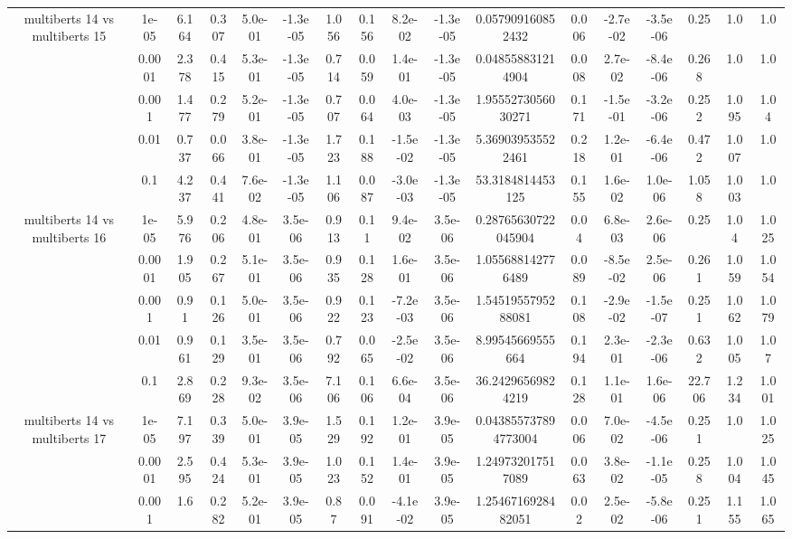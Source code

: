 \begin{tabular}{|c|c|c|c|c|c|c|c|c|c|c|c|c|c|c|c|c|}
\hline
\multirow{5}{*}{multiberts 14 vs multiberts 15} & 1e-05 & 6.164 & 0.307 & 5.0e-01 & -1.3e-05 & 1.056 & 0.156 & 8.2e-02 & -1.3e-05 & 0.057909160852432 & 0.006 & -2.7e-02 & -3.5e-06 & 0.25 & 1.0 & 1.0 \\
 & 0.0001 & 2.378 & 0.415 & 5.3e-01 & -1.3e-05 & 0.714 & 0.059 & 1.4e-01 & -1.3e-05 & 0.048558831214904 & 0.008 & 2.7e-02 & -8.4e-06 & 0.268 & 1.0 & 1.0 \\
 & 0.001 & 1.477 & 0.279 & 5.2e-01 & -1.3e-05 & 0.707 & 0.064 & 4.0e-03 & -1.3e-05 & 1.9555273056030271 & 0.171 & -1.5e-01 & -3.2e-06 & 0.252 & 1.095 & 1.04 \\
 & 0.01 & 0.737 & 0.066 & 3.8e-01 & -1.3e-05 & 1.723 & 0.188 & -1.5e-02 & -1.3e-05 & 5.369039535522461 & 0.218 & 1.2e-01 & -6.4e-06 & 0.472 & 1.007 & 1.0 \\
 & 0.1 & 4.237 & 0.441 & 7.6e-02 & -1.3e-05 & 1.106 & 0.087 & -3.0e-03 & -1.3e-05 & 53.3184814453125 & 0.155 & 1.6e-02 & 1.0e-06 & 1.058 & 1.003 & 1.0 \\
\hline
\multirow{5}{*}{multiberts 14 vs multiberts 16} & 1e-05 & 5.976 & 0.206 & 4.8e-01 & 3.5e-06 & 0.913 & 0.11 & 9.4e-02 & 3.5e-06 & 0.28765630722045904 & 0.04 & 6.8e-03 & 2.6e-06 & 0.25 & 1.04 & 1.025 \\
 & 0.0001 & 1.905 & 0.267 & 5.1e-01 & 3.5e-06 & 0.935 & 0.128 & 1.6e-01 & 3.5e-06 & 1.055688142776489 & 0.089 & -8.5e-02 & 2.5e-06 & 0.261 & 1.059 & 1.054 \\
 & 0.001 & 0.91 & 0.126 & 5.0e-01 & 3.5e-06 & 0.922 & 0.123 & -7.2e-03 & 3.5e-06 & 1.5451955795288081 & 0.108 & -2.9e-02 & -1.5e-07 & 0.251 & 1.062 & 1.079 \\
 & 0.01 & 0.961 & 0.129 & 3.5e-01 & 3.5e-06 & 0.792 & 0.065 & -2.5e-02 & 3.5e-06 & 8.99545669555664 & 0.194 & 2.3e-01 & -2.3e-06 & 0.632 & 1.005 & 1.07 \\
 & 0.1 & 2.869 & 0.228 & 9.3e-02 & 3.5e-06 & 7.106 & 0.106 & 6.6e-04 & 3.5e-06 & 36.24296569824219 & 0.128 & 1.1e-01 & 1.6e-06 & 22.706 & 1.234 & 1.001 \\
\hline
\multirow{5}{*}{multiberts 14 vs multiberts 17} & 1e-05 & 7.197 & 0.339 & 5.0e-01 & 3.9e-05 & 1.529 & 0.192 & 1.2e-01 & 3.9e-05 & 0.043855737894773004 & 0.006 & 7.0e-02 & -4.5e-06 & 0.251 & 1.0 & 1.025 \\
 & 0.0001 & 2.595 & 0.424 & 5.3e-01 & 3.9e-05 & 1.023 & 0.152 & 1.4e-01 & 3.9e-05 & 1.249732017517089 & 0.063 & 3.8e-02 & -1.1e-05 & 0.258 & 1.004 & 1.045 \\
 & 0.001 & 1.6 & 0.282 & 5.2e-01 & 3.9e-05 & 0.87 & 0.091 & -4.1e-02 & 3.9e-05 & 1.2546716928482051 & 0.02 & 2.5e-02 & -5.8e-06 & 0.251 & 1.155 & 1.065 \\

\end{tabular}
